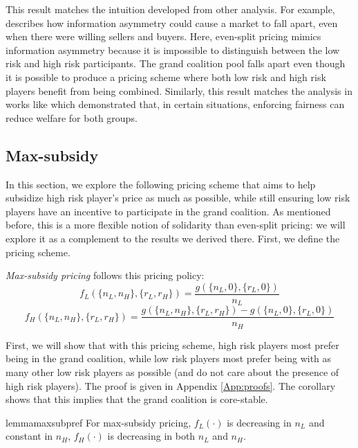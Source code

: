 \documentclass[sigconf]{acmart}
\newcommand{\nL}[0]{\ensuremath{n_L}}
\newcommand{\nH}[0]{\ensuremath{n_H}}
\newcommand{\rL}[0]{\ensuremath{r_L}}
\newcommand{\rH}[0]{\ensuremath{r_H}}
\newcommand{\cost}[0]{\ensuremath{g}}
\newcommand{\priceL}[0]{\ensuremath{f_L}}
\newcommand{\priceH}[0]{\ensuremath{f_H}}
\newcommand{\cd}[0]{\cdot}
\begin{document}
This result matches the intuition developed from other analysis. For example, \citet{akerlof1978market} describes how information asymmetry could cause a market to fall apart, even when there were willing sellers and buyers. Here, even-split pricing mimics information asymmetry because it is impossible to distinguish between the low risk and high risk participants. The grand coalition pool falls apart even though it is possible to produce a pricing scheme where both low risk and high risk players benefit from being combined. Similarly, this result matches the analysis in works like \citet{kasy2020fairness} which demonstrated that, in certain situations, enforcing fairness can reduce welfare for both groups. 


\subsection{Max-subsidy}

In this section, we explore the following pricing scheme that aims to help subsidize high risk player's price as much as possible, while still ensuring low risk players have an incentive to participate in the grand coalition. As mentioned before, this is a more flexible notion of solidarity than even-split pricing: we will explore it as a complement to the results we derived there. First, we define the pricing scheme. 

\begin{definition}\label{def:maxsub}
\emph{Max-subsidy pricing} follows this pricing policy: 
$$\priceL(\{\nL,\nH \}, \{\rL, \rH\}) = \frac{\cost(\{\nL,0 \}, \{\rL, 0\})}{\nL}$$
$$\priceH(\{\nL,\nH \}, \{\rL, \rH\}) = \frac{\cost(\{\nL,\nH \}, \{\rL, \rH\}) - \cost(\{\nL,0 \}, \{\rL, 0\})}{\nH}$$
\end{definition}
First, we will show that with this pricing scheme, high risk players most prefer being in the grand coalition, while low risk players most prefer being with as many other low risk players as possible (and do not care about the presence of high risk players). The proof is given in Appendix \ref{App:proofs}. The corollary shows that this implies that the grand coalition is core-stable.


\begin{restatable}{lemma}{maxsubpref}
\label{maxsubpref}
For max-subsidy pricing, $\priceL(\cd)$ is decreasing in $\nL$ and constant in $\nH$, $\priceH(\cd)$ is decreasing in both $\nL$ and $\nH$. 
\end{restatable}
\end{document}
